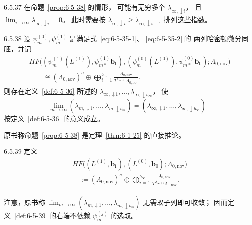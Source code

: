 \begin{remark}{6.5.37}\label{rem:6-5-37}
在命题~\ref{prop:6-5-38} 的情形，
可能有无穷多个 $\lambda_{\infty,\downarrow i}$，
且 $\lim_{i\to\infty}
\lambda_{\infty,\downarrow i}=0$。
此时需要按
$\lambda_{\infty,\downarrow i}
\ge\lambda_{\infty,\downarrow i+1}$
排列这些指数。
\end{remark}

\begin{proposition}{6.5.38}\label{prop:6-5-38}
设 $\psi_m^{(0)},\psi_m^{(1)}$
是满足式~\eqref{eq:6-5-35-1}、
\eqref{eq:6-5-35-2} 的
两列哈密顿微分同胚，并记
\[
\begin{aligned}
&HF\bigl(
(\psi_m^{(1)}(L^{(1)}),
\psi_{m*}^{(1)}\mathbf b_1),
(\psi_m^{(0)}(L^{(0)}),
\psi_{m*}^{(0)}\mathbf b_0);
\Lambda_{0,\mathrm{nov}}\bigr)\\
&\qquad\cong
(\Lambda_{0,\mathrm{nov}})^a
\oplus
\bigoplus_{i=1}^{b_m}
\frac{\Lambda_{0,\mathrm{nov}}}
{T^{\lambda_{m,\downarrow i}}
\Lambda_{0,\mathrm{nov}}}.
\end{aligned}
\]
则存在定义~\ref{def:6-5-36} 所述的
$\lambda_{\infty,\downarrow1},\ldots,
\lambda_{\infty,\downarrow b_\infty}$，
使
\[
\lim_{m\to\infty}
(\lambda_{m,\downarrow1},\ldots,
\lambda_{m,\downarrow b_m})
=
(\lambda_{\infty,\downarrow1},\ldots,
\lambda_{\infty,\downarrow b_\infty})
\]
按定义~\ref{def:6-5-36} 的意义成立。
\end{proposition}

原书称命题~\ref{prop:6-5-38}
是定理~\ref{thm:6-1-25}
的直接推论。

\begin{definition}{6.5.39}\label{def:6-5-39}
定义
\[
\begin{aligned}
&HF\bigl((L^{(1)},\mathbf b_1),
(L^{(0)},\mathbf b_0);
\Lambda_{0,\mathrm{nov}}\bigr)\\
&\quad:=
(\Lambda_{0,\mathrm{nov}})^a
\oplus
\bigoplus_{i=1}^{b_\infty}
\frac{\Lambda_{0,\mathrm{nov}}}
{T^{\lambda_{\infty,\downarrow i}}
\Lambda_{0,\mathrm{nov}}}.
\end{aligned}
\]
\end{definition}

注意，原书称
$\lim_{m\to\infty}
(\lambda_{m,\downarrow1},\ldots,
\lambda_{m,\downarrow b_m})$
无需取子列即可收敛；
因而定义~\ref{def:6-5-39}
的右端不依赖 $\psi_m^{(j)}$ 的选取。

